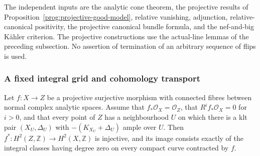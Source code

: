 The independent inputs are the analytic cone theorem, the projective
results of Proposition~\ref{prog:projective-good-model}, relative
vanishing, adjunction, relative-canonical positivity, the projective
canonical bundle formula, and the nef-and-big K\"ahler criterion.
The projective constructions use the actual-line lemmas of the preceding
subsection. No assertion of termination of an arbitrary sequence of
flips is used.

\subsubsection{A fixed integral grid and cohomology transport}

\begin{lemma}
\label{prog:integral-h2}
Let $f:X\to Z$ be a projective surjective morphism with connected fibres
between normal complex analytic spaces. Assume that $f_*\mathcal O_X=
\mathcal O_Z$, that $R^if_*\mathcal O_X=0$ for $i>0$, and that every point
of $Z$ has a neighbourhood $U$ on which there is a klt pair
$(X_U,\Delta_U)$ with $-(K_{X_U}+\Delta_U)$ ample over $U$.
Then $f^*:H^2(Z,\mathbb Z)\to H^2(X,\mathbb Z)$ is injective, and its
image consists exactly of the integral classes having degree zero on
every compact curve contracted by $f$.
\end{lemma}

